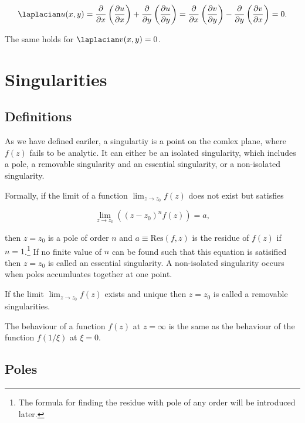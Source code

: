 \documentclass[english,a4paper,12pt]{report}
\begin{document}
\begin{equation}
    \laplacian u(x,y) = \frac{\partial }{\partial x} \left( \frac{\partial u}{\partial x}  \right) + \frac{\partial }{\partial y} \left( \frac{\partial u}{\partial y}  \right) = \frac{\partial }{\partial x} \left( \frac{\partial v}{\partial y}  \right) - \frac{\partial }{\partial y} \left( \frac{\partial v}{\partial x}  \right) = 0.
\end{equation}

The same holds for \(\laplacian v(x,y) = 0\). 

\section{Singularities}

\subsection{Definitions}

As we have defined eariler, a singulartiy is a point on the comlex plane, where \(f(z)\) fails to be analytic. It can either be an isolated singularity, which includes a pole, a removable singularity and an essential singularity, or a non-isolated singularity.

Formally, if the limit of a function \(\lim_{z \to z_0 } f(z)\) does not exist but satisfies

\begin{equation}
    \lim_{z \to z_0 } ((z-z_0 )^{n}f(z) ) = a, \label{lim} 
\end{equation}

then \(z = z_0 \)  is a pole of order \(n\) and \(a \equiv \text{Res}(f,z) \) is the residue of \(f(z)\) if \(n =1\).\footnote{The formula for finding the residue with pole of any order will be introduced later.} If no finite value of \(n\) can be found such that this equation is satisified then \(z = z_0 \) is called an essential singularity. A non-isolated singularity occurs when poles accumluates together at one point.

If the limit \(\lim_{z \to z_0 } f(z)\) exists and unique then \(z = z_0 \) is called a removable singularities.  

The behaviour of a function \(f(z)\) at \(z = \infty\) is the same as the behaviour of the function \(f(1 /\xi )\) at \(\xi  = 0\).   

\subsection{Poles}
\end{document}
